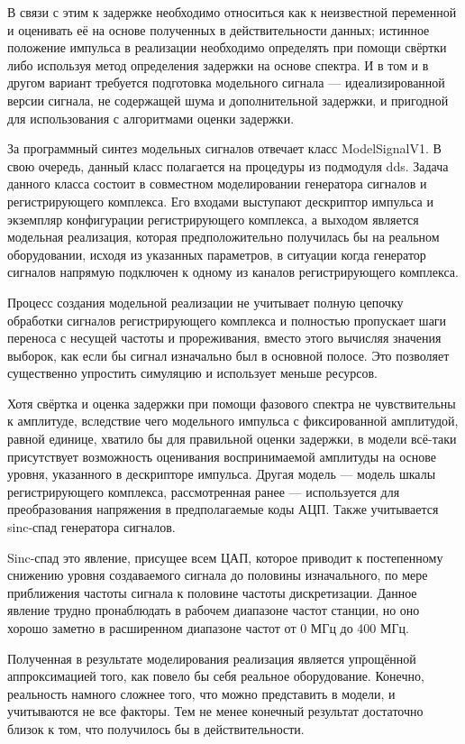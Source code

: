 \documentclass{report}
\begin{document}
В связи с этим к задержке необходимо относиться как к неизвестной переменной и оценивать её на основе полученных в действительности данных; истинное положение импульса в реализации необходимо определять при помощи свёртки либо используя метод определения задержки на основе спектра. И в том и в другом вариант требуется подготовка модельного сигнала --- идеализированной версии сигнала, не содержащей шума и дополнительной задержки, и пригодной для использования с алгоритмами оценки задержки.

За программный синтез модельных сигналов отвечает класс ModelSignalV1. В свою очередь, данный класс полагается на процедуры из подмодуля dds. Задача данного класса состоит в совместном моделировании генератора сигналов и регистрирующего комплекса. Его входами выступают дескриптор импульса и экземпляр конфигурации регистрирующего комплекса, а выходом является модельная реализация, которая предположительно получилась бы на реальном оборудовании, исходя из указанных параметров, в ситуации когда генератор сигналов напрямую подключен к одному из каналов регистрирующего комплекса.

Процесс создания модельной реализации не учитывает полную цепочку обработки сигналов регистрирующего комплекса и полностью пропускает шаги переноса с несущей частоты и прореживания, вместо этого вычисляя значения выборок, как если бы сигнал изначально был в основной полосе. Это позволяет существенно упростить симуляцию и использует меньше ресурсов.

Хотя свёртка и оценка задержки при помощи фазового спектра не чувствительны к амплитуде, вследствие чего  модельного импульса с фиксированной амплитудой, равной единице, хватило бы для правильной оценки задержки, в модели всё-таки присутствует возможность оценивания воспринимаемой амплитуды на основе уровня, указанного в дескрипторе импульса. Другая модель --- модель шкалы регистрирующего комплекса, рассмотренная ранее --- используется для преобразования напряжения в предполагаемые коды АЦП. Также учитывается sinc-спад генератора сигналов.

Sinc-спад это явление, присущее всем ЦАП, которое приводит к постепенному снижению уровня создаваемого сигнала до половины изначального, по мере приближения частоты сигнала к половине частоты дискретизации. Данное явление трудно пронаблюдать в рабочем диапазоне частот станции, но оно хорошо заметно в расширенном диапазоне частот от 0 МГц до 400 МГц.

Полученная в результате моделирования реализация является упрощённой аппроксимацией того, как повело бы себя реальное оборудование. Конечно, реальность намного сложнее того, что можно представить в модели, и учитываются не все факторы. Тем не менее конечный результат достаточно близок к том, что получилось бы в действительности.
\end{document}
